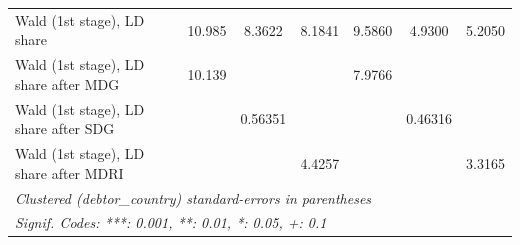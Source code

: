 \begin{table}[htbp]
\begin{tabular}{lcccccc}
      Wald (1st stage), LD share            & 10.985    & 8.3622    & 8.1841    & 9.5860   & 4.9300   & 5.2050\\  
      Wald (1st stage), LD share after MDG  & 10.139    &           &           & 7.9766   &          & \\  
      Wald (1st stage), LD share after SDG  &           & 0.56351   &           &          & 0.46316  & \\  
      Wald (1st stage), LD share after MDRI &           &           & 4.4257    &          &          & 3.3165\\  
      \midrule \midrule
      \multicolumn{7}{l}{\emph{Clustered (debtor\_country) standard-errors in parentheses}}\\
      \multicolumn{7}{l}{\emph{Signif. Codes: ***: 0.001, **: 0.01, *: 0.05, +: 0.1}}\\
   \end{tabular}
\end{table}


